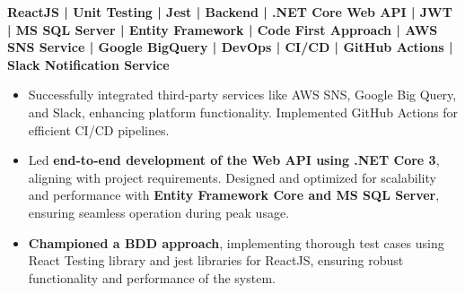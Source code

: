 \documentclass[letterpaper]{deedy-resume} %
\begin{document}
\begin{minipage}[t]{0.66\textwidth}
\textbf{ReactJS | Unit Testing | Jest | Backend | .NET Core Web API | JWT | MS SQL Server | Entity Framework | Code First Approach | AWS SNS Service | Google BigQuery | DevOps | CI/CD | GitHub Actions | Slack Notification Service} \\
\vspace{-\topsep}
\vspace{-\topsep}
\begin{itemize}
    \setlength\itemsep{-0.5em} %
    \item Successfully integrated third-party services like AWS SNS, Google Big Query, and Slack, enhancing platform functionality. Implemented GitHub Actions for efficient CI/CD pipelines.
    \item Led \textbf{end-to-end development of the Web API using .NET Core 3}, aligning with project requirements. Designed and optimized for scalability and performance with \textbf{Entity Framework Core and MS SQL Server}, ensuring seamless operation during peak usage.
    \item \textbf{Championed a BDD approach}, implementing thorough test cases using React Testing library and jest libraries for ReactJS, ensuring robust functionality and performance of the system.
\end{itemize}

\sectionspace %

 



\end{minipage} %











\end{document}
